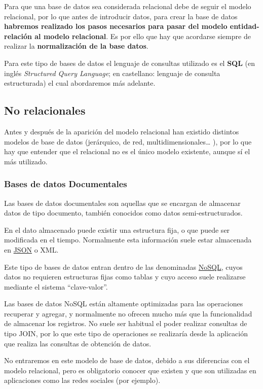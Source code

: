 Para que una base de datos sea considerada relacional debe de seguir el modelo relacional, por lo que antes de introducir datos, para crear la base de datos \textbf{habremos realizado los pasos necesarios para pasar del modelo entidad-relación al modelo relacional}. Es por ello que hay que acordarse siempre de realizar la \textbf{normalización de la base datos}.

Para este tipo de bases de datos el lenguaje de consultas utilizado es el \textbf{SQL} (en inglés \textit{Structured Query Language}; en castellano: lenguaje de consulta estructurada) el cual abordaremos más adelante.


\subsection{No relacionales}
Antes y después de la aparición del modelo relacional han existido distintos modelos de base de datos (jerárquico, de red, multidimensionales… ), por lo que hay que entender que el relacional no es el único modelo existente, aunque sí el más utilizado.


\subsubsection{Bases de datos Documentales}
Las bases de datos documentales son aquellas que se encargan de almacenar datos de tipo documento, también conocidos como datos semi-estructurados.

En el dato almacenado puede existir una estructura fija, o que puede ser modificada en el tiempo. Normalmente esta información suele estar almacenada en \hyperlink{json}{JSON} o XML.

Este tipo de bases de datos entran dentro de las denominadas \href{https://es.wikipedia.org/wiki/NoSQL}{NoSQL}, cuyos datos no requieren estructuras fijas como tablas y cuyo acceso suele realizarse mediante el sistema “clave-valor”.

Las bases de datos NoSQL están altamente optimizadas para las operaciones recuperar y agregar, y normalmente no ofrecen mucho más que la funcionalidad de almacenar los registros. No suele ser habitual el poder realizar consultas de tipo JOIN, por lo que este tipo de operaciones se realizaría desde la aplicación que realiza las consultas de obtención de datos.

No entraremos en este modelo de base de datos, debido a sus diferencias con el modelo relacional, pero es obligatorio conocer que existen y que son utilizadas en aplicaciones como las redes sociales (por ejemplo).

